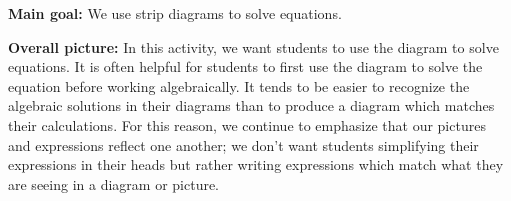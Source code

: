 \documentclass[nooutcomes,noauthor,handout]{ximera}
\begin{document}
\begin{instructorNotes} 



{\bf Main goal:} We use strip diagrams to solve equations.


{\bf Overall picture:} In this activity, we want students to use the diagram to solve equations. It is often helpful for students to first use the diagram to solve the equation before working algebraically. It tends to be easier to recognize the algebraic solutions in their diagrams than to produce a diagram which matches their calculations. For this reason, we continue to emphasize that our pictures and expressions reflect one another; we don't want students simplifying their expressions in their heads but rather writing expressions which match what they are seeing in a diagram or picture.





\end{instructorNotes}
\end{document}
